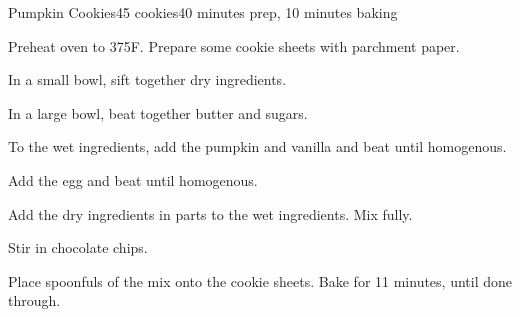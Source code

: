 \documentclass[../Cookbook.tex]{subfiles}
\begin{document}
\begin{recipe}{Pumpkin Cookies}{45 cookies}{40 minutes prep, 10 minutes baking}

Preheat oven to 375\0F. Prepare some cookie sheets with parchment paper.

In a small bowl, sift together dry ingredients.

In a large bowl, beat together butter and sugars.

To the wet ingredients, add the pumpkin and vanilla and beat until homogenous.

Add the egg and beat until homogenous.

\newstep
Add the dry ingredients in parts to the wet ingredients. Mix fully.

Stir in chocolate chips.

\newstep
Place spoonfuls of the mix onto the cookie sheets. Bake for 11 minutes, until done through.


\end{recipe}
\end{document}
